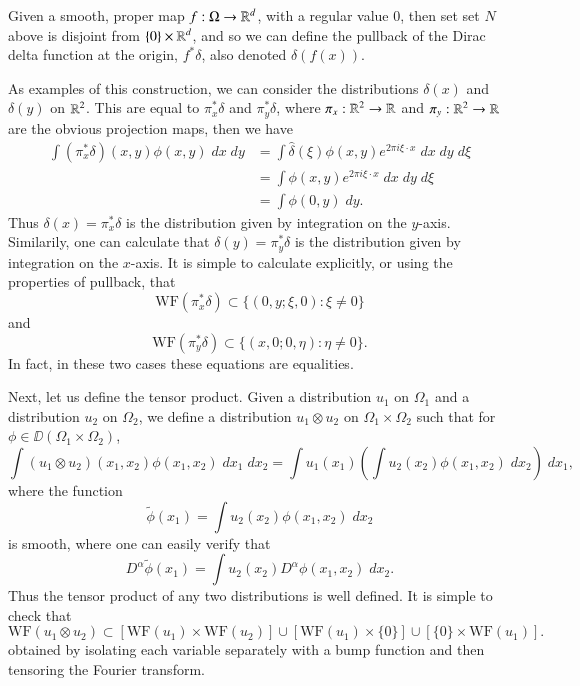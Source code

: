 \begin{example}
    Given a smooth, proper map $f: \Omega \to \operatorname{\mathbb{R}}^d$, with a regular value $0$, then set set $N$ above is disjoint from $\{ 0 \} \times \operatorname{\mathbb{R}}^d$, and so we can define the pullback of the Dirac delta function at the origin, $f^* \delta$, also denoted $\delta(f(x))$.

    As examples of this construction, we can consider the distributions $\delta(x)$ and $\delta(y)$ on $\operatorname{\mathbb{R}}^2$. This are equal to $\pi_x^* \delta$ and $\pi_y^* \delta$, where $\pi_x: \operatorname{\mathbb{R}}^2 \to \operatorname{\mathbb{R}}$ and $\pi_y: \operatorname{\mathbb{R}}^2 \to \operatorname{\mathbb{R}}$ are the obvious projection maps, then we have
    \begin{align*}
        \int (\pi_x^* \delta)(x,y) \phi(x,y)\; dx\; dy &= \int \widehat{\delta}(\xi) \phi(x,y) e^{2 \pi i \xi \cdot x}\; dx\; dy\; d\xi\\
        &= \int \phi(x,y) e^{2 \pi i \xi \cdot x}\; dx\; dy\; d\xi\\
        &= \int \phi(0,y)\; dy.
    \end{align*}
    Thus $\delta(x) = \pi_x^* \delta$ is the distribution given by integration on the $y$-axis. Similarily, one can calculate that $\delta(y) = \pi_y^* \delta$ is the distribution given by integration on the $x$-axis. It is simple to calculate explicitly, or using the properties of pullback, that
    \[ \text{WF}(\pi_x^* \delta) \subset \{ (0,y;\xi,0) : \xi \neq 0 \} \]
    and
    \[ \text{WF}(\pi_y^* \delta) \subset \{ (x,0;0,\eta): \eta \neq 0 \}. \]
    In fact, in these two cases these equations are equalities.
\end{example}

Next, let us define the tensor product. Given a distribution $u_1$ on $\Omega_1$ and a distribution $u_2$ on $\Omega_2$, we define a distribution $u_1 \otimes u_2$ on $\Omega_1 \times \Omega_2$ such that for $\phi \in \DD(\Omega_1 \times \Omega_2)$,
%
\[ \int (u_1 \otimes u_2)(x_1,x_2) \phi(x_1,x_2)\; dx_1\; dx_2 = \int u_1(x_1) \left( \int u_2(x_2) \phi(x_1,x_2)\; dx_2 \right)\; dx_1, \]
%
where the function
%
\[ \tilde{\phi}(x_1) = \int u_2(x_2) \phi(x_1,x_2)\; dx_2 \]
%
is smooth, where one can easily verify that
%
\[ D^\alpha \tilde{\phi}(x_1) = \int u_2(x_2) D^\alpha \phi(x_1,x_2)\; dx_2. \]
%
Thus the tensor product of any two distributions is well defined. It is simple to check that
%
\[ \text{WF}(u_1 \otimes u_2) \subset [\text{WF}(u_1) \times \text{WF}(u_2)] \cup [\text{WF}(u_1) \times \{ 0 \}] \cup [\{ 0 \} \times \text{WF}(u_1)]. \]
%
obtained by isolating each variable separately with a bump function and then tensoring the Fourier transform.

